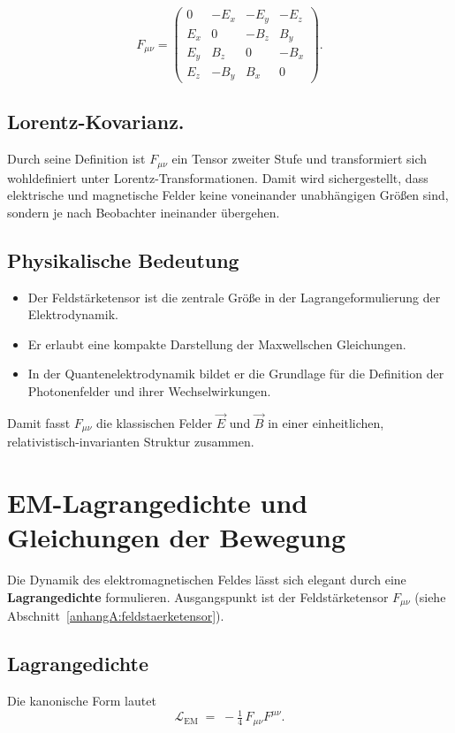 \[
F_{\mu\nu} = 
\begin{pmatrix}
	0      & -E_x & -E_y & -E_z \\
	E_x    & 0    & -B_z & B_y \\
	E_y    & B_z  & 0    & -B_x \\
	E_z    & -B_y & B_x  & 0
\end{pmatrix}.
\]

\subsection*{Lorentz-Kovarianz.}
Durch seine Definition ist \( F_{\mu\nu} \) ein Tensor zweiter Stufe
und transformiert sich wohldefiniert unter Lorentz-Transformationen.
Damit wird sichergestellt, dass elektrische und magnetische Felder
keine voneinander unabhängigen Größen sind, sondern je nach 
Beobachter ineinander übergehen.

\subsection*{Physikalische Bedeutung}
\begin{itemize}
	\item Der Feldstärketensor ist die zentrale Größe in der 
	Lagrangeformulierung der Elektrodynamik.
	\item Er erlaubt eine kompakte Darstellung der Maxwellschen Gleichungen.
	\item In der Quantenelektrodynamik bildet er die Grundlage 
	für die Definition der Photonenfelder und ihrer Wechselwirkungen.
\end{itemize}

\medskip
Damit fasst \( F_{\mu\nu} \) die klassischen Felder \( \vec{E} \) und \( \vec{B} \) 
in einer einheitlichen, relativistisch-invarianten Struktur zusammen.
\section{EM-Lagrangedichte und Gleichungen der Bewegung}
\label{anhangA:lagrange_em}

Die Dynamik des elektromagnetischen Feldes lässt sich elegant 
durch eine \textbf{Lagrangedichte} formulieren. 
Ausgangspunkt ist der Feldstärketensor \( F_{\mu\nu} \) 
(siehe Abschnitt~\ref{anhangA:feldstaerketensor}).

\subsection*{Lagrangedichte}
Die kanonische Form lautet
\[
\mathcal{L}_{\text{EM}} \;=\; -\tfrac{1}{4} \, F_{\mu\nu} F^{\mu\nu}.
\]

